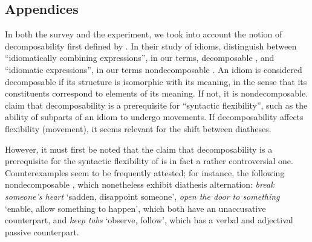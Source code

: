 \documentclass[output=paper]{langsci/langscibook}
\begin{document}
\begin{paperappendix}

\section*{Appendices}

In both the survey and the experiment, we took into account the notion of
decomposability first defined by \textcite{NunSagWas1994}. In their study of
idioms, \citeauthor{NunSagWas1994} distinguish between ``idiomatically combining
expressions'', in our terms, decomposable , and ``idiomatic expressions'',
in our terms nondecomposable . An idiom is considered decomposable if its
structure is isomorphic with its meaning, in the sense that its constituents
correspond to elements of its meaning. If not, it is nondecomposable.
\textcite{NunSagWas1994} claim that decomposability is a prerequisite for
``syntactic flexibility'', such as the ability of subparts of an idiom to
undergo movements.  If decomposability affects flexibility (movement), it seems
relevant for the shift between diatheses.

However, it must first be noted that the claim that decomposability is a
prerequisite for the syntactic flexibility of  is in fact a rather
controversial one. Counterexamples seem to be frequently attested; for
instance, the following nondecomposable , which nonetheless exhibit
diathesis alternation: \emph{break someone’s heart} ‘sadden, disappoint
someone’, \emph{open the door to something} ‘enable, allow something to
happen', which both have an unaccusative counterpart, and \emph{keep tabs}
‘observe, follow’, which has a verbal and adjectival passive
counterpart.


\end{paperappendix}
\end{document}
